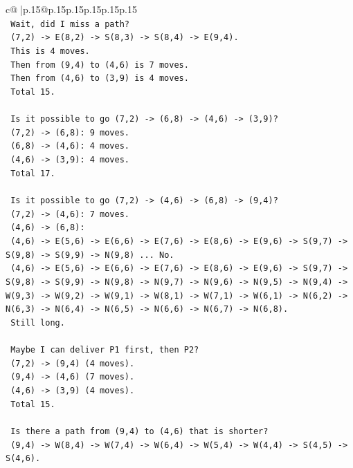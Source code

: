 \documentclass{article}
\begin{document}
{\begin{supertabular}{c@{$\;$}|p{.15\linewidth}@{}p{.15\linewidth}p{.15\linewidth}p{.15\linewidth}p{.15\linewidth}p{.15\linewidth}}
{{{\\ 
\texttt{    Wait, did I miss a path?} \\
\texttt{    (7,2) {-}> E(8,2) {-}> S(8,3) {-}> S(8,4) {-}> E(9,4).} \\
\texttt{    This is 4 moves.} \\
\texttt{    Then from (9,4) to (4,6) is 7 moves.} \\
\texttt{    Then from (4,6) to (3,9) is 4 moves.} \\
\texttt{    Total 15.} \\
\\ 
\texttt{    Is it possible to go (7,2) {-}> (6,8) {-}> (4,6) {-}> (3,9)?} \\
\texttt{    (7,2) {-}> (6,8): 9 moves.} \\
\texttt{    (6,8) {-}> (4,6): 4 moves.} \\
\texttt{    (4,6) {-}> (3,9): 4 moves.} \\
\texttt{    Total 17.} \\
\\ 
\texttt{    Is it possible to go (7,2) {-}> (4,6) {-}> (6,8) {-}> (9,4)?} \\
\texttt{    (7,2) {-}> (4,6): 7 moves.} \\
\texttt{    (4,6) {-}> (6,8):} \\
\texttt{    (4,6) {-}> E(5,6) {-}> E(6,6) {-}> E(7,6) {-}> E(8,6) {-}> E(9,6) {-}> S(9,7) {-}> S(9,8) {-}> S(9,9) {-}> N(9,8) ... No.} \\
\texttt{    (4,6) {-}> E(5,6) {-}> E(6,6) {-}> E(7,6) {-}> E(8,6) {-}> E(9,6) {-}> S(9,7) {-}> S(9,8) {-}> S(9,9) {-}> N(9,8) {-}> N(9,7) {-}> N(9,6) {-}> N(9,5) {-}> N(9,4) {-}> W(9,3) {-}> W(9,2) {-}> W(9,1) {-}> W(8,1) {-}> W(7,1) {-}> W(6,1) {-}> N(6,2) {-}> N(6,3) {-}> N(6,4) {-}> N(6,5) {-}> N(6,6) {-}> N(6,7) {-}> N(6,8).} \\
\texttt{    Still long.} \\
\\ 
\texttt{    Maybe I can deliver P1 first, then P2?} \\
\texttt{    (7,2) {-}> (9,4) (4 moves).} \\
\texttt{    (9,4) {-}> (4,6) (7 moves).} \\
\texttt{    (4,6) {-}> (3,9) (4 moves).} \\
\texttt{    Total 15.} \\
\\ 
\texttt{    Is there a path from (9,4) to (4,6) that is shorter?} \\
\texttt{    (9,4) {-}> W(8,4) {-}> W(7,4) {-}> W(6,4) {-}> W(5,4) {-}> W(4,4) {-}> S(4,5) {-}> S(4,6).} \\
}}}
\end{supertabular}}
\end{document}
